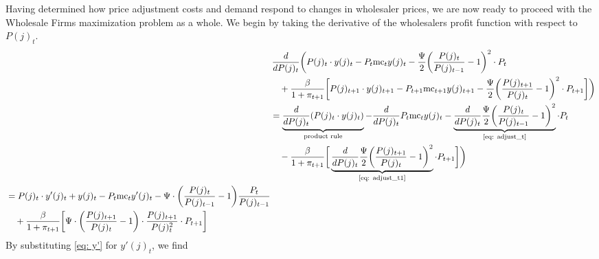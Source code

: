 \documentclass[11pt,a4paper,oneside]{book}
\begin{document}
Having determined how price adjustment costs and demand respond to changes in wholesaler prices, we are now ready to proceed with the Wholesale Firms maximization problem as a whole. We begin by taking the derivative of the wholesalers profit function with respect to $P(j)_t$.
 \begin{align}\nonumber
	&\,\frac{d}{dP(j)_t}\bigg(P(j)_t\cdot y(j)_t -P_t \text{mc}_ty(j)_t-\frac{\Psi}{2}\bigg(\frac{P(j)_t}{P(j)_{t-1}}-1\bigg)^2\cdot P_{t}
	\\&\quad\nonumber+\frac{\beta}{1+\pi_{t+1}}\bigg[P(j)_{t+1}\cdot y(j)_{t+1}-P_{t+1} \text{mc}_{t+1}y(j)_{t+1}-\frac{\Psi}{2}\bigg(\frac{P(j)_{t+1}}{P(j)_{t}}-1\bigg)^2\cdot P_{t+1}\bigg]\bigg)\\\nonumber
	&=\underbrace{\frac{d}{dP(j)_t}(P(j)_t\cdot y(j)_t)}_{\text{product rule}} - \frac{d}{dP(j)_t}P_t \text{mc}_ty(j)_t-\underbrace{\frac{d}{dP(j)_t}\frac{\Psi}{2}\bigg(\frac{P(j)_t}{P(j)_{t-1}}-1\bigg)^2}_\text{\eqref{eq: adjust_t}}\cdot P_{t}
	\\&\quad\nonumber-\frac{\beta}{1+\pi_{t+1}}\bigg[\underbrace{\frac{d}{dP(j)_t}\frac{\Psi}{2}\bigg(\frac{P(j)_{t+1}}{P(j)_{t}}-1\bigg)^2}_{\text{\eqref{eq: adjust_t1}}}\cdot P_{t+1}\bigg]\bigg)\\
	\begin{split}
		&=P(j)_t\cdot y'(j)_t + y(j)_t -P_t \text{mc}_ty'(j)_t-\Psi\cdot\bigg(\frac{P(j)_t}{P(j)_{t-1}}-1\bigg)\frac{P_{t}}{P(j)_{t-1}}\\ &\quad+\frac{\beta}{1+\pi_{t+1}}\bigg[\Psi\cdot\bigg(\frac{P(j)_{t+1}}{P(j)_{t}}-1\bigg)\cdot \frac{P(j)_{t+1}}{P(j)_t^2}\cdot P_{t+1}\bigg]
	\end{split}
\end{align}
By substituting \eqref{eq: y'} for $y'(j)_t$, we find
\end{document}
